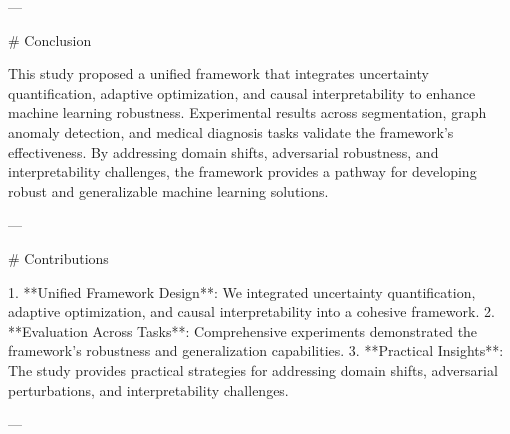 ---

# Conclusion

This study proposed a unified framework that integrates uncertainty quantification, adaptive optimization, and causal interpretability to enhance machine learning robustness. Experimental results across segmentation, graph anomaly detection, and medical diagnosis tasks validate the framework's effectiveness. By addressing domain shifts, adversarial robustness, and interpretability challenges, the framework provides a pathway for developing robust and generalizable machine learning solutions.

---

# Contributions

1. **Unified Framework Design**: We integrated uncertainty quantification, adaptive optimization, and causal interpretability into a cohesive framework.
2. **Evaluation Across Tasks**: Comprehensive experiments demonstrated the framework's robustness and generalization capabilities.
3. **Practical Insights**: The study provides practical strategies for addressing domain shifts, adversarial perturbations, and interpretability challenges.

---